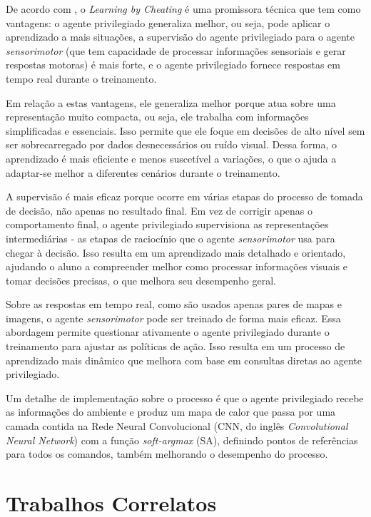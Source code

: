 \documentclass[a4paper,12pt,Times]{article}
\begin{document}
 De acordo com , o \textit{Learning by Cheating} é uma promissora técnica que tem como vantagens: o agente privilegiado generaliza melhor, ou seja, pode aplicar o aprendizado a mais situações, a supervisão do agente privilegiado para o agente \textit{sensorimotor} (que tem capacidade de processar informações sensoriais e gerar respostas motoras) é mais forte, e o agente privilegiado fornece respostas em tempo real durante o treinamento.
 
 Em relação a estas vantagens, ele generaliza melhor porque atua sobre uma representação muito compacta, ou seja, ele trabalha com informações simplificadas e essenciais. Isso permite que ele foque em decisões de alto nível sem ser sobrecarregado por dados desnecessários ou ruído visual. Dessa forma, o aprendizado é mais eficiente e menos suscetível a variações, o que o ajuda a adaptar-se melhor a diferentes cenários durante o treinamento. 
 
 A supervisão é mais eficaz porque ocorre em várias etapas do processo de tomada de decisão, não apenas no resultado final. Em vez de corrigir apenas o comportamento final, o agente privilegiado supervisiona as representações intermediárias - as etapas de raciocínio que o agente \textit{sensorimotor} usa para chegar à decisão. Isso resulta em um aprendizado mais detalhado e orientado, ajudando o aluno a compreender melhor como processar informações visuais e tomar decisões precisas, o que melhora seu desempenho geral.

 Sobre as respostas em tempo real, como são usados apenas pares de mapas e imagens, o agente \textit{sensorimotor} pode ser treinado de forma mais eficaz. Essa abordagem permite questionar ativamente o agente privilegiado durante o treinamento para ajustar as políticas de ação. Isso resulta em um processo de aprendizado mais dinâmico que melhora com base em consultas diretas ao agente privilegiado.

Um detalhe de implementação sobre o processo é que o agente privilegiado recebe as informações do ambiente e produz um mapa de calor que passa por uma camada contida na Rede Neural Convolucional (CNN, do inglês \textit{Convolutional Neural Network}) com a função \textit{soft-argmax} (SA), definindo pontos de referências para todos os comandos, também melhorando o desempenho do processo.

\section{Trabalhos Correlatos}
\end{document}
